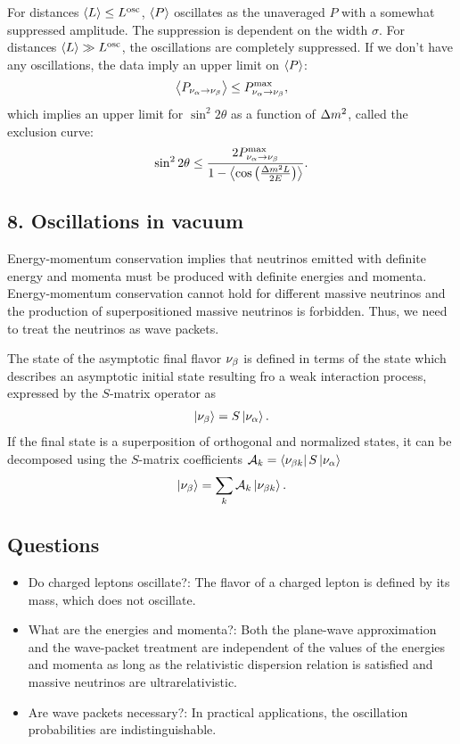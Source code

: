 \documentclass[twocolumn]{article}
\begin{document}
For distances $\left\langle {L} \right \rangle \le L^\text{osc}$, $\left\langle {P} \right \rangle$ oscillates as the unaveraged $P$ with a somewhat suppressed amplitude. The suppression is dependent on the width $\sigma$. For distances $\left\langle {L} \right \rangle \gg L^\text{osc}$, the oscillations are completely suppressed.
If we don't have any oscillations, the data imply an upper limit on $\left\langle {P} \right \rangle$:
\begin{align*}
  \left\langle {P_{\ensuremath{\nu_\alpha}\to \ensuremath{\nu_\beta}}} \right \rangle \le P^\text{max}_{\nu_\alpha \to \nu_\beta}
,\end{align*}
which implies an upper limit for $\sin^2 2\theta$ as a function of $\dm$, called the exclusion curve:
\begin{align*}
  \sin^2 2\theta \le \frac{2 P^\text{max}_{\na \to \nb}}{1- \avg{\cos \left( \frac{\dm L}{2E} \right)}}
.\end{align*}


\subsection*{8. Oscillations in vacuum}
Energy-momentum conservation implies that neutrinos emitted with definite energy and momenta must be produced with definite energies and momenta. Energy-momentum conservation cannot hold for different massive neutrinos and the production of superpositioned massive neutrinos is forbidden. Thus, we need to treat the neutrinos as wave packets. 

The state of the asymptotic final flavor $\nu_\beta$ is defined in terms of the state which describes an asymptotic initial state  resulting fro a weak interaction process, expressed by the $S$-matrix operator as 
\begin{align*}
  \ket{\nu_\beta} = S \ket{\nu_\alpha}
.\end{align*}
If the final state is a superposition of orthogonal and normalized states, it can be decomposed using the $S$-matrix coefficients $\mathcal{A}_k = \bra{\nu_{\beta k}} S \ket{\nu_\alpha}$ 
\begin{align*}
\ket{\nu_\beta} = \sum_k \mathcal{A}_k \ket{\nu_{\beta k}}
.\end{align*}
\subsection{Questions}
\begin{itemize}
  \item Do charged leptons oscillate?: The flavor of a charged lepton is defined by its mass, which does not oscillate.
  \item What are the energies and momenta?: Both the plane-wave approximation and the wave-packet treatment are independent of the values of the energies and momenta as long as the relativistic dispersion relation is satisfied and massive neutrinos are ultrarelativistic.
  \item Are wave packets necessary?: In practical applications, the oscillation probabilities are indistinguishable.
\end{itemize}
\end{document}
